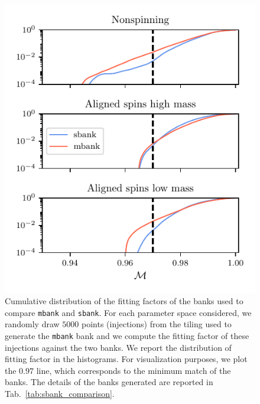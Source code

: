 \documentclass[twocolumn,showpacs,preprintnumbers,nofootinbib,prd,
superscriptaddress,10pt]{revtex4-2}
\begin{document}
\begin{figure}[t!]
	\includegraphics{sbank_comparison}
	\caption{
	Cumulative distribution of the fitting factors of the banks used to compare \texttt{mbank} and \texttt{sbank}. For each parameter space considered, we randomly draw $5000$ points (injections) from the tiling used to generate the \texttt{mbank} bank and we compute the fitting factor of these injections against the two banks. We report the distribution of fitting factor in the histograms. For visualization purposes, we plot the $0.97$ line, which corresponds to the minimum match of the banks.
	The details of the banks generated are reported in Tab.~\ref{tab:sbank_comparison}.
	}
	\label{fig:sbank_comparison}
\end{figure}
\end{document}
